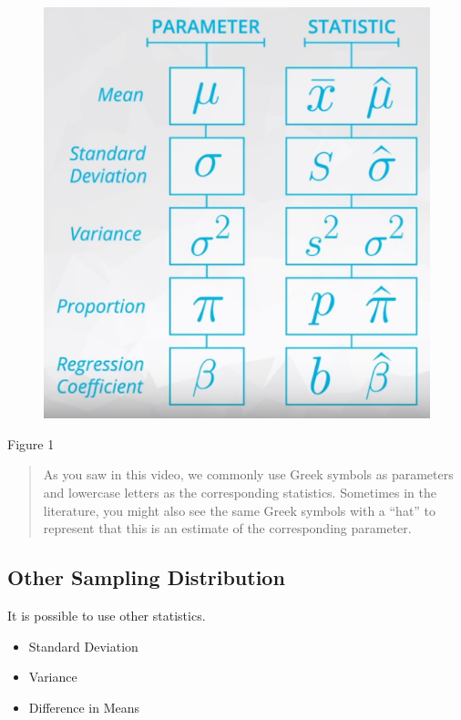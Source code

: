 \documentclass[]{book}
\providecommand{\tightlist}{%
  \setlength{\itemsep}{0pt}\setlength{\parskip}{0pt}}
\begin{document}
\begin{figure}
\centering
\includegraphics{01-img/c4_l10_01.png}
\caption{}
\end{figure}

Figure 1

\begin{quote}
As you saw in this video, we commonly use Greek symbols as parameters
and lowercase letters as the corresponding statistics. Sometimes in the
literature, you might also see the same Greek symbols with a ``hat'' to
represent that this is an estimate of the corresponding parameter.
\end{quote}

\subsection{Other Sampling
Distribution}\label{other-sampling-distribution}

It is possible to use other statistics.

\begin{itemize}
\tightlist
\item
  Standard Deviation
\item
  Variance
\item
  Difference in Means
\end{itemize}
\end{document}
